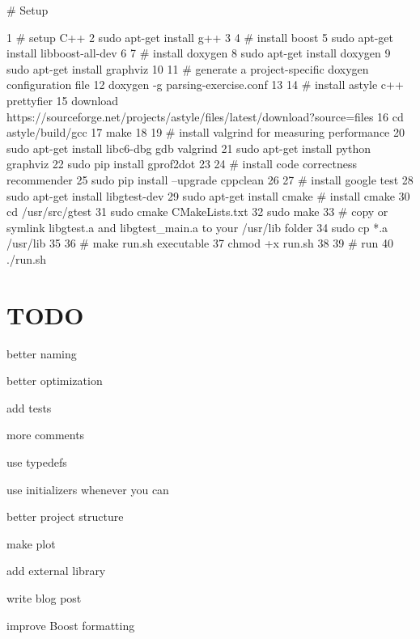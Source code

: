 \# Setup 
\begin{DoxyCode}
1 # setup C++
2 sudo apt-get install g++
3 
4 # install boost
5 sudo apt-get install libboost-all-dev
6 
7 # install doxygen
8 sudo apt-get install doxygen
9 sudo apt-get install graphviz
10 
11 # generate a project-specific doxygen configuration file
12 doxygen -g parsing-exercise.conf
13 
14 # install astyle c++ prettyfier
15 download https://sourceforge.net/projects/astyle/files/latest/download?source=files
16 cd astyle/build/gcc
17 make
18 
19 # install valgrind for measuring performance
20 sudo apt-get install libc6-dbg gdb valgrind
21 sudo apt-get install python graphviz
22 sudo pip install gprof2dot
23 
24 # install code correctness recommender
25 sudo pip install --upgrade cppclean
26 
27 # install google test
28 sudo apt-get install libgtest-dev
29 sudo apt-get install cmake # install cmake
30 cd /usr/src/gtest
31 sudo cmake CMakeLists.txt
32 sudo make
33 # copy or symlink libgtest.a and libgtest\_main.a to your /usr/lib folder
34 sudo cp *.a /usr/lib
35 
36 # make run.sh executable
37 chmod +x run.sh
38 
39 # run
40 ./run.sh
\end{DoxyCode}


\section*{T\+O\+DO}


\begin{DoxyItemize}
\item better naming
\item better optimization
\item add tests
\item more comments
\item use typedefs
\item use initializers whenever you can
\item better project structure
\item make plot
\item add external library
\item write blog post
\item improve Boost formatting 
\end{DoxyItemize}